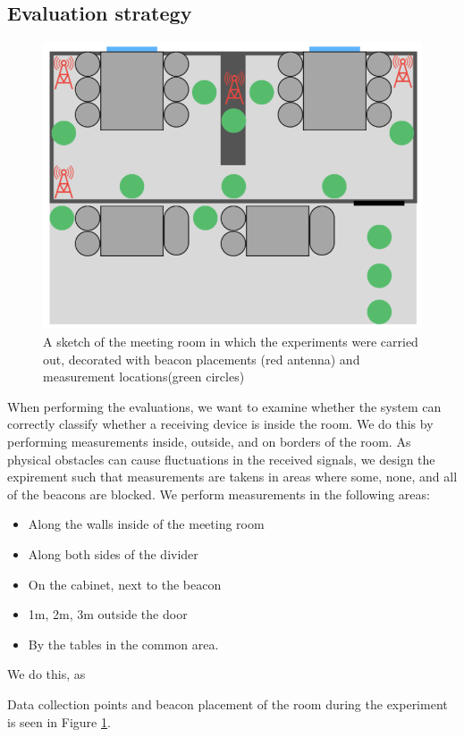 \subsection{Evaluation strategy}
\begin{figure}[h]
    \centering
    \includegraphics[scale=0.7]{images/experiment_setup.png}
    \caption{A sketch of the meeting room in which the experiments were carried out, decorated with beacon placements (red antenna) and measurement locations(green circles)}
    \label{fig:experiment_setup}
\end{figure}
When performing the evaluations, we want to examine whether the system can correctly classify whether a receiving device is inside the room.
We do this by performing measurements inside, outside, and on borders of the room.
As physical obstacles can cause fluctuations in the received signals, we design the expirement such that measurements are takens in areas where some, none, and all of the beacons are blocked. 
We perform measurements in the following areas:
\begin{itemize}
    \item Along the walls inside of the meeting room
    \item Along both sides of the divider
    \item On the cabinet, next to the beacon
    \item 1m, 2m, 3m outside the door   
    \item By the tables in the common area. 
\end{itemize}
We do this, as 

Data collection points and beacon placement of the room during the experiment is seen in Figure \ref{fig:experiment_setup}.
